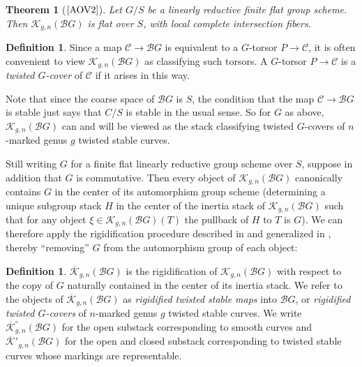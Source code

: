 \documentclass[11pt]{amsart}
\newtheorem{theorem}[subsection]{Theorem}
\theoremstyle{definition}
\newtheorem{definition}[subsection]{Definition}
\begin{document}
\begin{theorem}[$\textrm{\cite[5.1]{AOV2}}$]
Let $G/S$ be a linearly reductive finite flat group scheme. Then ${\mathcal{K}}_{g,n}({\mathcal{B}} G)$ is flat over $S$, with local complete intersection fibers. 
\end{theorem}

\begin{definition}
Since a map ${\mathcal{C}} \rightarrow {\mathcal{B}} G$ is equivalent to a $G$-torsor $P \rightarrow {\mathcal{C}}$, it is often convenient to view ${\mathcal{K}}_{g,n}( {\mathcal{B}} G)$ as classifying such torsors. A $G$-torsor $P \rightarrow {\mathcal{C}}$ is a \textit{twisted $G$-cover} of ${\mathcal{C}}$ if it arises in this way. 
\end{definition}

Note that since the coarse space of ${\mathcal{B}} G$ is $S$, the condition that the map ${\mathcal{C}} \rightarrow {\mathcal{B}} G$ is stable just says that $C/S$ is stable in the usual sense. So for $G$ as above, ${\mathcal{K}}_{g,n}({\mathcal{B}} G)$ can and will be viewed as the stack classifying twisted $G$-covers of $n$-marked genus $g$ twisted stable curves.

Still writing $G$ for a finite flat linearly reductive group scheme over $S$, suppose in addition that $G$ is commutative. Then every object of ${\mathcal{K}}_{g,n}({\mathcal{B}} G)$ canonically contains $G$ in the center of its automorphism group scheme (determining a unique subgroup stack $H$ in the center of the inertia stack of ${\mathcal{K}}_{g,n}({\mathcal{B}} G)$ such that for any object $\xi \in {\mathcal{K}}_{g,n}({\mathcal{B}} G)(T)$ the pullback of $H$ to $T$ is $G$). We can therefore apply the rigidification procedure described in \cite[\S5.1]{ACV} and generalized in \cite[Appendix A]{AOV1}, thereby ``removing'' $G$ from the automorphism group of each object:

\begin{definition}
$\overline{\mathcal{K}}_{g,n}({\mathcal{B}} G)$ is the rigidification of ${\mathcal{K}}_{g,n}({\mathcal{B}} G)$ with respect to the copy of $G$ naturally contained in the center of its inertia stack. We refer to the objects of $\overline{\mathcal{K}}_{g,n}({\mathcal{B}} G)$ as \textit{rigidified twisted stable maps} into ${\mathcal{B}} G$, or \textit{rigidified twisted $G$-covers} of $n$-marked genus $g$ twisted stable curves. We write $\overline{\mathcal{K}}_{g,n}^\circ({\mathcal{B}} G)$ for the open substack corresponding to smooth curves and $\overline{\mathcal{K}}'_{g,n}({\mathcal{B}} G)$ for the open and closed substack corresponding to twisted stable curves whose markings are representable.
\end{definition}
\end{document}
